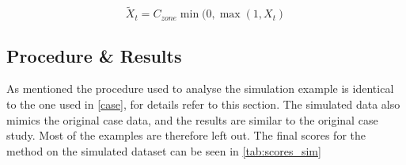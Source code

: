 \begin{equation}
    \tilde X_t = C_{zone} \min(0, \max(1, X_t)
\end{equation}

\subsection{Procedure \& Results}

As mentioned the procedure used to analyse the simulation example is identical to the one used in \cref{case}, for details refer to this section. The simulated data also mimics the original case data, and the results are similar to the original case study. Most of the examples are therefore left out.
The final scores for the method on the simulated dataset can be seen in \cref{tab:scores_sim}

